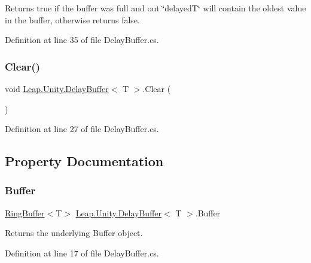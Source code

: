 Returns true if the buffer was full and out \char`\"{}delayed\+T\char`\"{} will contain the oldest value in the buffer, otherwise returns false. 



Definition at line 35 of file Delay\+Buffer.\+cs.

\mbox{\label{class_leap_1_1_unity_1_1_delay_buffer_a09e508932731b3c33b43e26b1d795823}} 
\subsubsection{\texorpdfstring{Clear()}{Clear()}}
{\footnotesize\ttfamily void \mbox{\hyperlink{class_leap_1_1_unity_1_1_delay_buffer}{Leap.\+Unity.\+Delay\+Buffer}}$<$ T $>$.Clear (\begin{DoxyParamCaption}{ }\end{DoxyParamCaption})}



Definition at line 27 of file Delay\+Buffer.\+cs.



\subsection{Property Documentation}
\mbox{\label{class_leap_1_1_unity_1_1_delay_buffer_a75f215dccf141ab56b4b026ffa007753}} 
\subsubsection{\texorpdfstring{Buffer}{Buffer}}
{\footnotesize\ttfamily \mbox{\hyperlink{class_leap_1_1_unity_1_1_ring_buffer}{Ring\+Buffer}}$<$T$>$ \mbox{\hyperlink{class_leap_1_1_unity_1_1_delay_buffer}{Leap.\+Unity.\+Delay\+Buffer}}$<$ T $>$.Buffer\hspace{0.3cm}{\ttfamily [get]}}



Returns the underlying Buffer object. 



Definition at line 17 of file Delay\+Buffer.\+cs.


